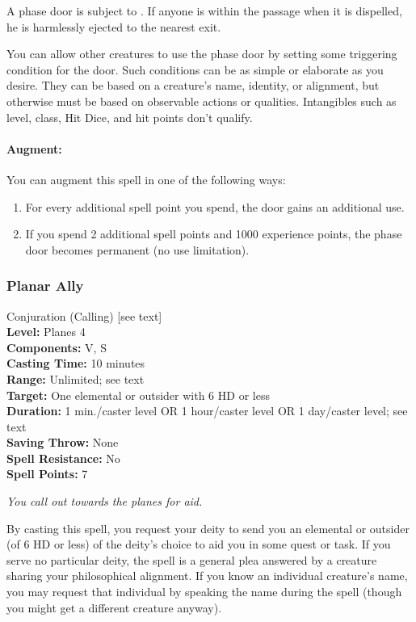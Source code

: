 A phase door is subject to . 
If anyone is within the passage when it is dispelled, he is harmlessly ejected to the nearest exit.

You can allow other creatures to use the phase door by setting some triggering condition for the door. 
Such conditions can be as simple or elaborate as you desire. 
They can be based on a creature's name, identity, or alignment, but otherwise must be based on observable actions or qualities. 
Intangibles such as level, class, Hit Dice, and hit points don't qualify. 

\paragraph{Augment:} You can augment this spell in one of the following ways:
\begin{enumerate}
 \item For every additional spell point you spend, the door gains an additional use.
 \item If you spend 2 additional spell points and 1000 experience points, the phase door becomes permanent (no use limitation).
\end{enumerate}

\subsubsection{Planar Ally}
\label{Spell:PlanarAlly}
Conjuration (Calling) [see text]
\\ \textbf{Level:} Planes 4
\\ \textbf{Components:} V, S
\\ \textbf{Casting Time:} 10 minutes
\\ \textbf{Range:} Unlimited; see text
\\ \textbf{Target:} One elemental or outsider with 6 HD or less
\\ \textbf{Duration:} 1 min./caster level OR 1 hour/caster level OR 1 day/caster level; see text
\\ \textbf{Saving Throw:} None
\\ \textbf{Spell Resistance:} No
\\ \textbf{Spell Points:} 7

\emph{You call out towards the planes for aid.}

By casting this spell, you request your deity to send you an elemental or outsider (of 6 HD or less) of the deity's choice to aid you in some quest or task. 
If you serve no particular deity, the spell is a general plea answered by a creature sharing your philosophical alignment. 
If you know an individual creature's name, you may request that individual by speaking the name during the spell (though you might get a different creature anyway).

